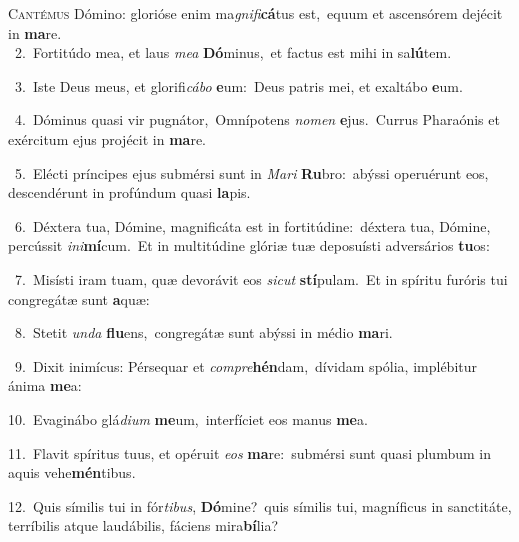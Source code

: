 \lettrine{\initial\textcolor{\initialcolor}{C}}{antémus} Dómino: glorióse enim ma\-\textit{gni}\-\textit{fi}\textbf{cá}tus est,~\star equum et ascensórem dejécit in \textbf{ma}\-re.\\
{\numbfont\textcolor{\numbcolor}{~2.}}~Fortitúdo mea, et laus \textit{me}\-\textit{a} \textbf{Dó}\-minus,~\star et factus est mihi in sa\-\textbf{lú}\-tem.\par
{\numbfont\textcolor{\numbcolor}{~3.}}~Iste Deus meus, et glorifi\-\textit{cá}\-\textit{bo} \textbf{e}\-um:~\star Deus patris mei, et exaltábo \textbf{e}\-um.\par
{\numbfont\textcolor{\numbcolor}{~4.}}~Dóminus quasi vir pugnátor,~\dagger Omnípotens \textit{no}\-\textit{men} \textbf{e}\-jus.~\star Currus Pharaónis et exércitum ejus projécit in \textbf{ma}\-re.\par
{\numbfont\textcolor{\numbcolor}{~5.}}~Elécti príncipes ejus submérsi sunt in \textit{Ma}\-\textit{ri} \textbf{Ru}\-bro:~\star abýssi operuérunt eos, descendérunt in profúndum quasi \textbf{la}\-pis.\par
{\numbfont\textcolor{\numbcolor}{~6.}}~Déxtera tua, Dómine, magnificáta est in fortitúdine:~\dagger déxtera tua, Dómine, percússit \textit{in}\-\textit{i}\textbf{mí}cum.~\star Et in multitúdine glóriæ tuæ deposuísti adversários \textbf{tu}\-os:\par
{\numbfont\textcolor{\numbcolor}{~7.}}~Misísti iram tuam, quæ devorávit eos \textit{sic}\-\textit{ut} \textbf{stí}\-pulam.~\star Et in spíritu furóris tui congregátæ sunt \textbf{a}\-quæ:\par
{\numbfont\textcolor{\numbcolor}{~8.}}~Stetit \textit{un}\-\textit{da} \textbf{flu}\-ens,~\star congregátæ sunt abýssi in médio \textbf{ma}\-ri.\par
{\numbfont\textcolor{\numbcolor}{~9.}}~Dixit inimícus: Pérsequar et \textit{com}\-\textit{pre}\textbf{hén}dam,~\star dívidam spólia, implébitur ánima \textbf{me}\-a:\par
{\numbfont\textcolor{\numbcolor}{10.}}~Evaginábo glá\-\textit{di}\-\textit{um} \textbf{me}\-um,~\star interfíciet eos manus \textbf{me}\-a.\par
{\numbfont\textcolor{\numbcolor}{11.}}~Flavit spíritus tuus, et opéruit \textit{e}\-\textit{os} \textbf{ma}\-re:~\star submérsi sunt quasi plumbum in aquis vehe\-\textbf{mén}\-tibus.\par
{\numbfont\textcolor{\numbcolor}{12.}}~Quis símilis tui in fór\-\textit{ti}\-\textit{bus}, \textbf{Dó}\-mine?~\star quis símilis tui, magníficus in sanctitáte, terríbilis atque laudábilis, fáciens mira\-\textbf{bí}\-lia?\par
